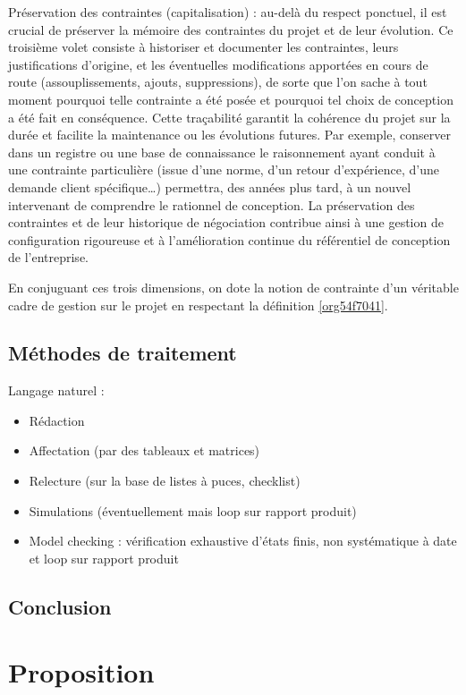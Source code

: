 \documentclass[a4paper,12pt]{article}
\begin{document}
Préservation des contraintes (capitalisation) : au-delà du respect ponctuel, il est crucial de préserver la mémoire des contraintes du projet et de leur évolution. Ce troisième volet consiste à historiser et documenter les contraintes, leurs justifications d’origine, et les éventuelles modifications apportées en cours de route (assouplissements, ajouts, suppressions), de sorte que l’on sache à tout moment pourquoi telle contrainte a été posée et pourquoi tel choix de conception a été fait en conséquence. Cette traçabilité garantit la cohérence du projet sur la durée et facilite la maintenance ou les évolutions futures. Par exemple, conserver dans un registre ou une base de connaissance le raisonnement ayant conduit à une contrainte particulière (issue d’une norme, d’un retour d’expérience, d’une demande client spécifique…) permettra, des années plus tard, à un nouvel intervenant de comprendre le rationnel de conception. La préservation des contraintes et de leur historique de négociation contribue ainsi à une gestion de configuration rigoureuse et à l’amélioration continue du référentiel de conception de l’entreprise.

En conjuguant ces trois dimensions, on dote la notion de contrainte d’un véritable cadre de gestion sur le projet en respectant la définition \ref{org54f7041}.
\subsection{Méthodes de traitement}
\label{sec:org7d2cf3c}
Langage naturel :
\begin{itemize}
\item Rédaction
\item Affectation (par des tableaux et matrices)
\item Relecture (sur la base de listes à puces, checklist)
\item Simulations (éventuellement mais loop sur rapport produit)
\item Model checking : vérification exhaustive d'états finis, non systématique à date et loop sur rapport produit
\end{itemize}
\subsection{Conclusion}
\label{sec:orgc0fdcfe}
\clearpage
\section{Proposition}
\label{sec:org99dfd0a}
\end{document}
